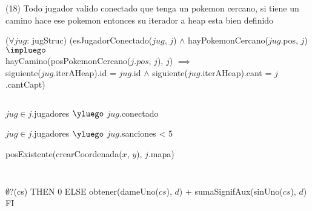 \begin{Representacion}
$ $\newline

(18) Todo jugador valido conectado que tenga un pokemon cercano, si tiene un camino hace ese pokemon entonces su iterador a heap esta bien definido $ $\newline

($\forall jug$: jugStruc) (esJugadorConectado($jug$, $j$) $\land$ hayPokemonCercano($jug$.pos, $j$) $\impluego$ \\
hayCamino(posPokemonCercano($j.pos$, $j$), $j$) $\implies$ \\
siguiente($jug$.iterAHeap).id = $jug$.id $\land$ siguiente($jug$.iterAHeap).cant = $j$.cantCapt) 

$ $\newline



%
{$jug \in j$.jugadores $\yluego$ $jug$.conectado} 
$ $\newline

%
{$jug \in j$.jugadores $\yluego$ $jug$.sanciones < 5} 
$ $\newline

%
{posExistente(crearCoordenada($x$, $y$), $j$.mapa)}
$ $\newline

%
$ $\newline

%
$ $\newline

%
{\IF $\emptyset$?(cs) THEN 0 ELSE obtener(dameUno($cs$), $d$) + sumaSignifAux(sinUno($cs$), $d$) FI} 
$ $\newline


\end{Representacion}
